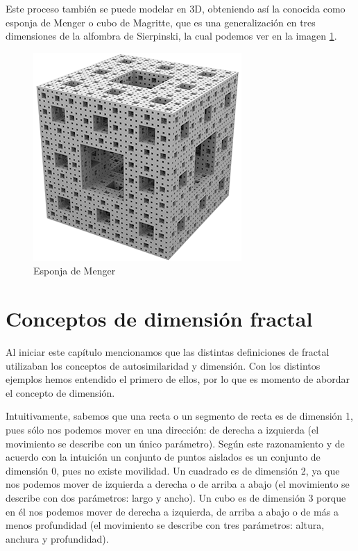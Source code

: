 Este proceso también se puede modelar en 3D, obteniendo así la conocida como esponja de Menger o cubo de Magritte, que es una generalización en tres dimensiones de la alfombra de Sierpinski, la cual podemos ver en la imagen \ref{fig:esponja-menger}.

\begin{figure} [h]
\centering
\includegraphics[scale = 0.6]{img/esponja_menger.png}
\caption{Esponja de Menger}
 \label{fig:esponja-menger}
\end{figure}

\section{Conceptos de dimensión fractal}
\label{section:dimension}

Al iniciar este capítulo mencionamos que las distintas definiciones de fractal utilizaban los conceptos de autosimilaridad y dimensión. Con los distintos ejemplos hemos entendido el primero de ellos, por lo que es momento de abordar el concepto de dimensión. 

Intuitivamente, sabemos que una recta o un segmento de recta es de dimensión 1, pues sólo nos podemos mover en una dirección: de derecha a izquierda (el movimiento se describe con un único parámetro). Según este razonamiento y de acuerdo con la intuición un conjunto de puntos aislados es un conjunto de dimensión 0, pues no existe movilidad. Un cuadrado es de dimensión 2, ya que nos podemos mover de izquierda a derecha o de arriba a abajo (el movimiento se describe con dos parámetros: largo y ancho). Un cubo es de dimensión 3 porque en él nos podemos mover de derecha a izquierda, de arriba a abajo o de más a menos profundidad (el movimiento se describe con tres parámetros: altura, anchura y profundidad). 

